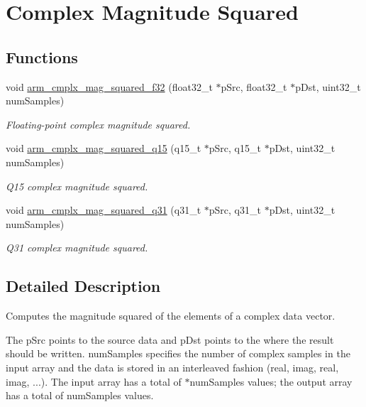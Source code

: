 \hypertarget{group__cmplx__mag__squared}{}\section{Complex Magnitude Squared}
\label{group__cmplx__mag__squared}
\subsection*{Functions}
\begin{DoxyCompactItemize}
\item 
void \hyperlink{group__cmplx__mag__squared_gaa7faccc0d96b061d8b7d0d7d82045074}{arm\+\_\+cmplx\+\_\+mag\+\_\+squared\+\_\+f32} (float32\+\_\+t $\ast$p\+Src, float32\+\_\+t $\ast$p\+Dst, uint32\+\_\+t num\+Samples)
\begin{DoxyCompactList}\small\item\em Floating-\/point complex magnitude squared. \end{DoxyCompactList}\item 
void \hyperlink{group__cmplx__mag__squared_ga45537f576102d960d467eb722b8431f2}{arm\+\_\+cmplx\+\_\+mag\+\_\+squared\+\_\+q15} (q15\+\_\+t $\ast$p\+Src, q15\+\_\+t $\ast$p\+Dst, uint32\+\_\+t num\+Samples)
\begin{DoxyCompactList}\small\item\em Q15 complex magnitude squared. \end{DoxyCompactList}\item 
void \hyperlink{group__cmplx__mag__squared_ga384b0538101e8c03fa4fa14271e63b04}{arm\+\_\+cmplx\+\_\+mag\+\_\+squared\+\_\+q31} (q31\+\_\+t $\ast$p\+Src, q31\+\_\+t $\ast$p\+Dst, uint32\+\_\+t num\+Samples)
\begin{DoxyCompactList}\small\item\em Q31 complex magnitude squared. \end{DoxyCompactList}\end{DoxyCompactItemize}


\subsection{Detailed Description}
Computes the magnitude squared of the elements of a complex data vector.

The {\ttfamily p\+Src} points to the source data and {\ttfamily p\+Dst} points to the where the result should be written. {\ttfamily num\+Samples} specifies the number of complex samples in the input array and the data is stored in an interleaved fashion (real, imag, real, imag, ...). The input array has a total of {$\ast$num\+Samples} values; the output array has a total of {\ttfamily num\+Samples} values.

